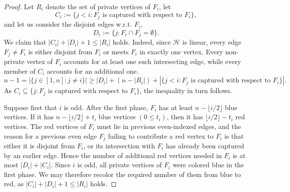 \documentclass[10pt]{article}
\theoremstyle{definition}
\begin{document}
\begin{proof}
		
		Let $R_i$ denote the set of private vertices of $F_i$, let
		$$
		C_i:=\{j<i: F_j \text{ is captured with respect to } F_i\},$$
		and let us consider the disjoint edges w.r.t. $F_i$,
		$$
		D_i:=\{j:F_i\cap F_j=\emptyset\}.$$
		We claim that
		$
		\ensuremath{|C_i|+|D_i|+1\le |R_i|}
		$ holds. Indeed, since $\mathcal H$ is linear, every edge $F_j\neq F_i$ is either
		disjoint from $F_i$ or meets $F_i$ in exactly one vertex.  Every
		non-private vertex of $F_i$ accounts for at least one such intersecting
		edge, while every member of $C_i$ accounts for an additional one.
		\begin{equation}
			n-1=|\{j\in[1,n] : j\neq i\}|\ge |D_i|+(n-|R_i|)+|\{j<i: F_j \text{ is captured with respect to } F_i\}|.   
		\end{equation}
		As $C_i \subseteq \{j: F_j \text{ is captured with respect to } F_i\}$, the inequality in turn follows.
		
		
		Suppose first that $i$ is odd.  After the first phase, $F_i$ has at least
		$n-\lfloor i/2\rfloor$ blue vertices. If it has $n-\lfloor i/2\rfloor+t_i$ blue vertices \((0\le t_i)\), then it has $\lfloor i/2\rfloor-t_i$
		red vertices. The red vertices of $F_i$ must lie in previous even-indexed
		edges, and the reason for a previous even edge $F_j$ failing to contribute a red
		vertex to $F_i$ is that either it is disjoint from $F_i$, or its
		intersection with $F_i$ has already been captured by an earlier edge. Hence the number of additional red vertices needed in $F_i$ is at most $|D_i|+|C_i|.$ Since $i$ is odd, all private vertices of $F_i$ were
		colored blue in the first phase. We may therefore recolor the required
		number of them from blue to red, as $
		\ensuremath{|C_i|+|D_i|+1\le |R_i|}
		$ holds.
		
		

\end{proof}
\end{document}
